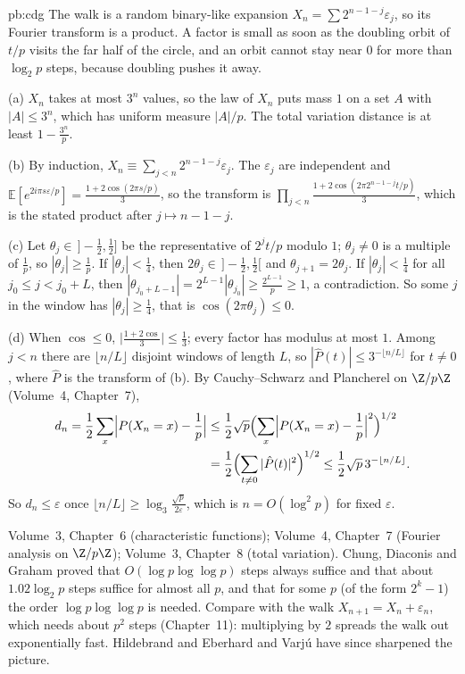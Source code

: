\begin{solution}{pb:cdg}
\idea The walk is a random binary-like expansion $X_n=\sum2^{n-1-j}\varepsilon_j$, so its Fourier transform is a product. A factor is
small as soon as the doubling orbit of $t/p$ visits the far half of the circle, and an orbit cannot stay near $0$ for more than
$\log_2p$ steps, because doubling pushes it away.

\writeup (a) $X_n$ takes at most $3^n$ values, so the law of $X_n$ puts mass $1$ on a set $A$ with $|A|\le3^n$, which has uniform measure
$|A|/p$. The total variation distance is at least $1-\frac{3^n}p$.

(b) By induction, $X_n\equiv\sum_{j<n}2^{n-1-j}\varepsilon_j$. The $\varepsilon_j$ are independent and
$\mathbb E[e^{2i\pi s\varepsilon/p}]=\frac{1+2\cos(2\pi s/p)}3$, so the transform is $\prod_{j<n}\frac{1+2\cos(2\pi2^{n-1-j}t/p)}3$, which is the
stated product after $j\mapsto n-1-j$.

(c) Let $\theta_j\in\,]-\frac12,\frac12]$ be the representative of $2^jt/p$ modulo $1$; $\theta_j\ne0$ is a multiple of $\frac1p$, so
$|\theta_j|\ge\frac1p$. If $|\theta_j|<\frac14$, then $2\theta_j\in\,]-\frac12,\frac12[$ and $\theta_{j+1}=2\theta_j$. If
$|\theta_j|<\frac14$ for all $j_0\le j<j_0+L$, then $|\theta_{j_0+L-1}|=2^{L-1}|\theta_{j_0}|\ge\frac{2^{L-1}}p\ge1$, a contradiction. So some
$j$ in the window has $|\theta_j|\ge\frac14$, that is $\cos(2\pi\theta_j)\le0$.

(d) When $\cos\le0$, $\bigl|\frac{1+2\cos}3\bigr|\le\frac13$; every factor has modulus at most $1$. Among $j<n$ there are
$\lfloor n/L\rfloor$ disjoint windows of length $L$, so $|\hat P(t)|\le3^{-\lfloor n/L\rfloor}$ for $t\ne0$, where $\hat P$ is the transform of
(b). By Cauchy--Schwarz and Plancherel on $\Z/p\Z$ (Volume~4, Chapter~7),
\[
\begin{aligned}d_n=\frac12\sum_x\Bigl|P(X_n=x)-\frac1p\Bigr|&\le\frac12\sqrt p\Bigl(\sum_x\Bigl|P(X_n=x)-\frac1p\Bigr|^2\Bigr)^{1/2}\\&=\frac12\Bigl(\sum_{t\ne0}|\hat P(t)|^2\Bigr)^{1/2}\le\frac12\sqrt p\,3^{-\lfloor n/L\rfloor}.\end{aligned}
\]
So $d_n\le\varepsilon$ once $\lfloor n/L\rfloor\ge\log_3\frac{\sqrt p}{2\varepsilon}$, which is $n=O(\log^2p)$ for fixed $\varepsilon$.

\tools Volume~3, Chapter~6 (characteristic functions); Volume~4, Chapter~7 (Fourier analysis on $\Z/p\Z$); Volume~3, Chapter~8 (total
variation).
\leads Chung, Diaconis and Graham proved that $O(\log p\log\log p)$ steps always suffice and that about $1.02\log_2p$ steps suffice for almost all
$p$, and that for some $p$ (of the form $2^k-1$) the order $\log p\log\log p$ is needed. Compare with the walk $X_{n+1}=X_n+\varepsilon_n$,
which needs about $p^2$ steps (Chapter~11): multiplying by $2$ spreads the walk out exponentially fast. Hildebrand and Eberhard
and Varjú have since sharpened the picture.
\end{solution}

